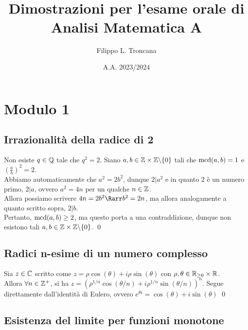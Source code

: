 \documentclass[openany]{book}
\title{Dimostrazioni per l'esame orale di Analisi Matematica A}
\author{Filippo L. Troncana}
\date{A.A. 2023/2024}
\begin{document}
\maketitle
\tableofcontents


\chapter{Modulo 1}

\section{Irrazionalità della radice di 2}

\begin{theorem}{}{}
    Non esiste $q \in \mathbb{Q}$ tale che $q^2=2$.
    \proof 
    Siano $a,b \in \mathbb{Z}\times \mathbb{Z} \backslash \{0\}$ tali che $\operatorname{mcd} (a,b)= 1$ e $\left(\frac{a}{b}\right)^2 = 2$.\\
    Abbiamo automaticamente che $a^2 = 2b^2$, dunque $2|a^2$ e in quanto $2$ è un numero primo, $2|a$, ovvero $a^2 = 4n$ per un qualche $n \in \mathbb{Z}$.\\
    Allora possiamo scrivere $4n = 2b^2 \Rarr b^2 = 2n$, ma allora analogamente a quanto scritto sopra, $2|b$.\\
    Pertanto, $\operatorname{mcd}(a,b)\ge 2$, ma questo porta a una contraddizione, dunque non esistono tali $a,b \in \mathbb{Z}\times\mathbb{Z}\backslash\{0\}$.
    \qed
\end{theorem}

\section{Radici n-esime di un numero complesso}

\begin{theorem}{}{}
    Sia $z \in \mathbb{C}$ scritto come $z = \rho\cos(\theta) + i\rho\sin(\theta)$ con $\rho, \theta \in \mathbb{R}_{\ge 0}\times \mathbb{R}$.\\
    Allora $\forall n \in \mathbb{Z}^+$, si ha $z = (\rho^{1/n} \cos(\theta/n) +i\rho^{1/n} \sin(\theta/n) )^n$.
    \proof
    Segue direttamente dall'identità di Eulero, ovvero $e^{\theta i} = \cos(\theta) + i\sin(\theta)$
    \qed
\end{theorem}

\section{Esistenza del limite per funzioni monotone}
\end{document}
